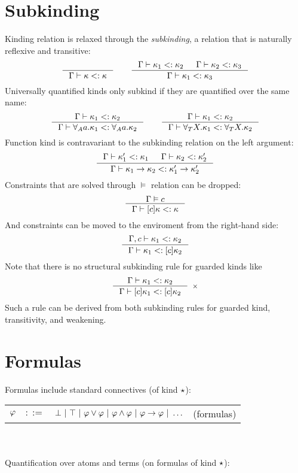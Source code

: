 \documentclass[english, mgr]{iithesis}
\renewcommand{\it}[1]{\textit{#1}}
\begin{document}
\section{Subkinding}
Kinding relation is relaxed through the \it{subkinding},
a relation that is naturally reflexive and transitive:
$$
\inference{
}{
  \cEnv \vdash \kind \subkind \kind
}
\qquad
\inference{
  \cEnv \vdash \kind_1 \subkind \kind_2 &
  \cEnv \vdash \kind_2 \subkind \kind_3
}{
  \cEnv \vdash \kind_1 \subkind \kind_3
}
$$
Universally quantified kinds only subkind if they are quantified over the same name:
$$
\inference{
  \cEnv \vdash \kind_1 \subkind \kind_2
}{
  \cEnv \vdash \kForallAtom{\atomv} \kind_1 \subkind \kForallAtom{\atomv} \kind_2
}
\qquad
\inference{
  \cEnv \vdash \kind_1 \subkind \kind_2
}{
  \cEnv \vdash \kForallTerm{\termv} \kind_1 \subkind \kForallTerm{\termv} \kind_2
}
$$
Function kind is contravariant to the subkinding relation on the left argument:
$$
\inference{
  \cEnv \vdash \kind_1' \subkind \kind_1 &
  \cEnv \vdash \kind_2 \subkind \kind_2'
}{
  \cEnv \vdash \kind_1 \karrow \kind_2 \subkind \kind_1' \karrow \kind_2'
}
$$
Constraints that are solved through $\vDash$ relation can be dropped:
$$
\inference{
  \cEnv \vDash \constr
}{
  \cEnv \vdash \kGuard{\constr}\kind \subkind \kind
}
$$
And constraints can be moved to the enviroment from the right-hand side:
$$
\inference{
  \cEnv, \constr \vdash \kind_1 \subkind \kind_2
}{
  \cEnv \vdash \kind_1 \subkind \kGuard{\constr}\kind_2
}
$$
Note that there is no structural subkinding rule for guarded kinds like
$$
\inference{\cEnv \vdash \kind_1 \subkind \kind_2}{
  \cEnv \vdash \kGuard{\constr} \kind_1 \subkind \kGuard{\constr} \kind_2
}[\ensuremath{\times}]
$$
Such a rule can be derived from both subkinding rules for guarded kind,
transitivity, and weakening.

\section{Formulas}
Formulas include standard connectives (of kind $\star$):

\begin{tabular}{rrlr}
$\varphi$ & $::=$ & $\bot
               \ |\  \top
               \ |\  \varphi \vee \varphi
               \ |\  \varphi \wedge \varphi
               \ |\  \varphi \to \varphi
               \ |\  \ldots $ & (formulas)
\end{tabular}
\\ \\
Quantification over atoms and terms (on formulas of kind $\star$):
\end{document}
